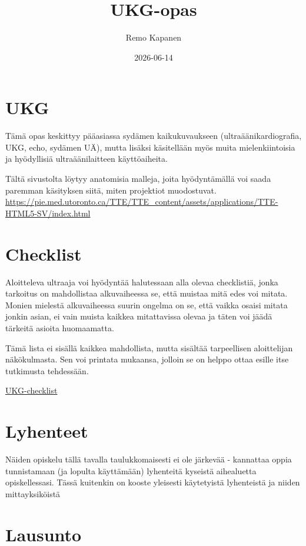 \documentclass[
]{book}
\title{UKG-opas}
\author{Remo Kapanen}
\date{2026-06-14}
\begin{document}
\maketitle

{
\setcounter{tocdepth}{1}
\tableofcontents
}
\chapter{UKG}\label{ukg}

Tämä opas keskittyy pääasiassa sydämen kaikukuvaukseen (ultraäänikardiografia, UKG, echo, sydämen UÄ), mutta lisäksi käsitellään myös muita mielenkiintoisia ja hyödyllisiä ultraäänilaitteen käyttöaiheita.

Tältä sivustolta löytyy anatomisia malleja, joita hyödyntämällä voi saada paremman käsityksen siitä, miten projektiot muodostuvat. \url{https://pie.med.utoronto.ca/TTE/TTE_content/assets/applications/TTE-HTML5-SV/index.html}

\chapter{Checklist}\label{checklist}

Aloitteleva ultraaja voi hyödyntää halutessaan alla olevaa checklistiä, jonka tarkoitus on mahdollistaa alkuvaiheessa se, että muistaa mitä edes voi mitata. Monien mielestä alkuvaiheessa suurin ongelma on se, että vaikka osaisi mitata jonkin asian, ei vain muista kaikkea mitattavissa olevaa ja täten voi jäädä tärkeitä asioita huomaamatta.

Tämä lista ei sisällä kaikkea mahdollista, mutta sisältää tarpeellisen aloittelijan näkökulmasta. Sen voi printata mukaansa, jolloin se on helppo ottaa esille itse tutkimusta tehdessään.

\href{images/UKG-checklist.pdf}{UKG-checklist}

\chapter{Lyhenteet}\label{lyhenteet}

Näiden opiskelu tällä tavalla taulukkomaisesti ei ole järkevää - kannattaa oppia tunnistamaan (ja lopulta käyttämään) lyhenteitä kyseistä aihealuetta opiskellessasi. Tässä kuitenkin on kooste yleisesti käytetyistä lyhenteistä ja niiden mittayksiköistä

\chapter{Lausunto}\label{lausunto}
\end{document}
